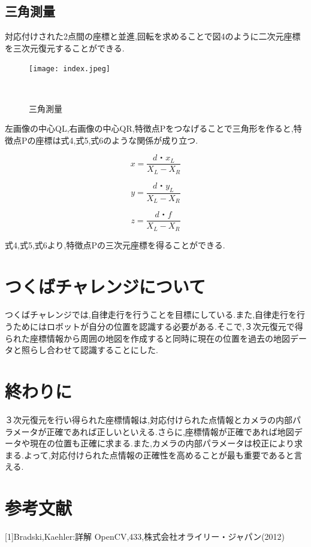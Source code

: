 \documentclass[11pt]{si2016}
\begin{document}
\subsection{三角測量}
対応付けされた2点間の座標と並進,回転を求めることで図4のように二次元座標を三次元復元することができる.

\begin{figure}[b]
 \begin{center}
  \texttt{[image: index.jpeg]}
 　\caption{三角測量}%
 　\label{fig:01}%
 \end{center}
\end{figure}

左画像の中心Q{\scriptsize L},右画像の中心Q{\scriptsize R},特徴点Pをつなげることで三角形を作ると,特徴点Pの座標は式4,式5,式6のような関係が成り立つ.

\begin{equation}
 x=\frac {d・x_{L}}{X_{L}-X_{R}}
\end{equation}

\begin{equation}
 y=\frac {d・y_{L}}{X_{L}-X_{R}}
\end{equation}

\begin{equation}
 z=\frac {d・f}{X_{L}-X_{R}}
\end{equation}


式4,式5,式6より,特徴点Pの三次元座標を得ることができる.


\section{つくばチャレンジについて}
つくばチャレンジでは,自律走行を行うことを目標にしている.また,自律走行を行うためにはロボットが自分の位置を認識する必要がある.そこで,３次元復元で得られた座標情報から周囲の地図を作成すると同時に現在の位置を過去の地図データと照らし合わせて認識することにした.


\section{終わりに}
３次元復元を行い得られた座標情報は,対応付けられた点情報とカメラの内部パラメータが正確であれば正しいといえる.さらに,座標情報が正確であれば地図データや現在の位置も正確に求まる.また,カメラの内部パラメータは校正により求まる.よって,対応付けられた点情報の正確性を高めることが最も重要であると言える.
\section{参考文献}
[1]Bradski,Kaehler:詳解 OpenCV,433,株式会社オライリー・ジャパン(2012)


\end{document}
